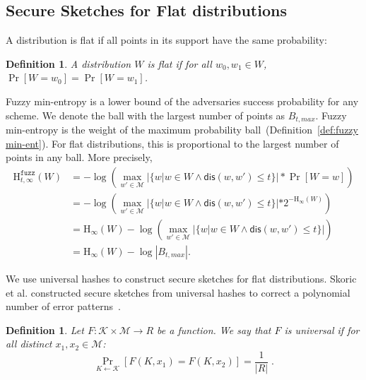 \documentclass[11pt]{article}
\newcommand{\defref}[1]{\mbox{Definition~\ref{#1}}}
\newcommand{\dis}{\ensuremath{\mathsf{dis}}}
\newcommand{\Hoo}{\mathrm{H}_\infty}
\newcommand{\Hfuzz}{\mathrm{H}^{\mathtt{fuzz}}_{t,\infty}}
\newtheorem{definition}[theorem]{Definition}
\begin{document}

\subsection{Secure Sketches for Flat distributions}
A distribution is flat if all points in its support have the same probability:
\begin{definition}
A distribution $W$ is \emph{flat} if for all $w_0, w_1 \in W$, $\Pr[W=w_0] = \Pr[W=w_1]$.  
\end{definition}

Fuzzy min-entropy is a lower bound of the adversaries success probability for any scheme.  We denote the ball with the largest number of points as $B_{t, max}$.  Fuzzy min-entropy is the weight of the maximum probability ball~(\defref{def:fuzzy min-ent}).  For flat distributions, this is proportional to the largest number of points in any ball.  More precisely, 
\begin{align}
\Hfuzz(W) &= -\log \left(\max_{w' \in \mathcal{M}} \left| \{w | w\in W \wedge \dis(w, w')\le t\} \right|* \Pr[W=w]\right) \nonumber \\
&= -\log\left( \max_{w' \in \mathcal{M}} |\{w | w\in W \wedge \dis(w, w')\le t\}| *2^{-\Hoo(W)}\right) \nonumber \\
&=\Hoo(W) -\log\left( \max_{w' \in \mathcal{M}}| \{w | w\in W \wedge \dis(w, w')\le t\} |\right)\nonumber \\
&= \Hoo(W) -\log |B_{t, max}|.\label{eq:fuzz for flat}
\end{align}

\noindent We use universal hashes to construct secure sketches for flat distributions.  Skoric et al. constructed secure sketches from universal hashes to correct a polynomial number of error patterns~\cite{skoric2009efficient}.


\begin{definition}
Let $F : \mathcal{K} \times \mathcal{M} \to R$ be a function.  We say that $F$ is \emph{universal} if for all distinct $x_1, x_2 \in \mathcal{M}$:
\[
 \Pr_{K \leftarrow \mathcal{K}}[F(K, x_1) = F(K, x_2)] = \frac{1}{|R|} \;.
\]
\end{definition}
\end{document}

